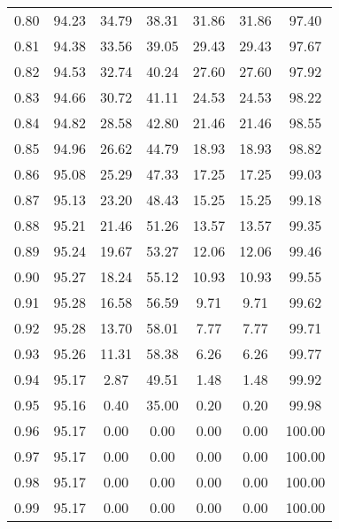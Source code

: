 \begin{tabular}{|c|c|c|c|c|c|c|}
      0.80 &     94.23 &     34.79 &      38.31 &   31.86 &      31.86 &         97.40 \\
      0.81 &     94.38 &     33.56 &      39.05 &   29.43 &      29.43 &         97.67 \\
      0.82 &     94.53 &     32.74 &      40.24 &   27.60 &      27.60 &         97.92 \\
      0.83 &     94.66 &     30.72 &      41.11 &   24.53 &      24.53 &         98.22 \\
      0.84 &     94.82 &     28.58 &      42.80 &   21.46 &      21.46 &         98.55 \\
      0.85 &     94.96 &     26.62 &      44.79 &   18.93 &      18.93 &         98.82 \\
      0.86 &     95.08 &     25.29 &      47.33 &   17.25 &      17.25 &         99.03 \\
      0.87 &     95.13 &     23.20 &      48.43 &   15.25 &      15.25 &         99.18 \\
      0.88 &     95.21 &     21.46 &      51.26 &   13.57 &      13.57 &         99.35 \\
      0.89 &     95.24 &     19.67 &      53.27 &   12.06 &      12.06 &         99.46 \\
      0.90 &     95.27 &     18.24 &      55.12 &   10.93 &      10.93 &         99.55 \\
      0.91 &     95.28 &     16.58 &      56.59 &    9.71 &       9.71 &         99.62 \\
      0.92 &     95.28 &     13.70 &      58.01 &    7.77 &       7.77 &         99.71 \\
      0.93 &     95.26 &     11.31 &      58.38 &    6.26 &       6.26 &         99.77 \\
      0.94 &     95.17 &      2.87 &      49.51 &    1.48 &       1.48 &         99.92 \\
      0.95 &     95.16 &      0.40 &      35.00 &    0.20 &       0.20 &         99.98 \\
      0.96 &     95.17 &      0.00 &       0.00 &    0.00 &       0.00 &        100.00 \\
      0.97 &     95.17 &      0.00 &       0.00 &    0.00 &       0.00 &        100.00 \\
      0.98 &     95.17 &      0.00 &       0.00 &    0.00 &       0.00 &        100.00 \\
      0.99 &     95.17 &      0.00 &       0.00 &    0.00 &       0.00 &        100.00 \\
\bottomrule
\end{tabular}
